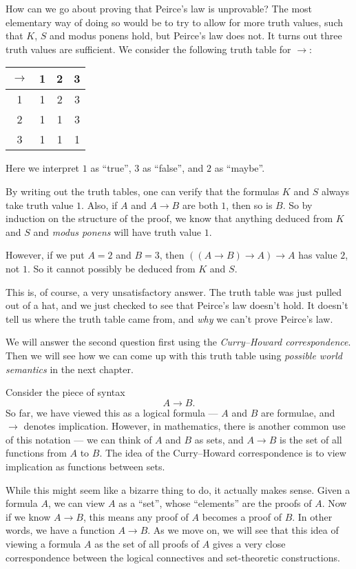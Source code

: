 \documentclass[a4paper]{article}
\begin{document}
How can we go about proving that Peirce's law is unprovable? The most elementary way of doing so would be to try to allow for more truth values, such that $K$, $S$ and modus ponens hold, but Peirce's law does not. It turns out three truth values are sufficient. We consider the following truth table for $\to$:
\begin{center}
  \begin{tabular}{cccc}
    \toprule
    $\to$ & 1 & 2 & 3\\
    \midrule
    1 & 1 & 2 & 3\\
    2 & 1 & 1 & 3\\
    3 & 1 & 1 & 1\\
    \bottomrule
  \end{tabular}
\end{center}
Here we interpret $1$ as ``true'', $3$ as ``false'', and $2$ as ``maybe''.

By writing out the truth tables, one can verify that the formulas $K$ and $S$ always take truth value $1$. Also, if $A$ and $A \to B$ are both $1$, then so is $B$. So by induction on the structure of the proof, we know that anything deduced from $K$ and $S$ and \emph{modus ponens} will have truth value $1$.

However, if we put $A = 2$ and $B = 3$, then $((A \to B) \to A) \to A$ has value $2$, not $1$. So it cannot possibly be deduced from $K$ and $S$.

This is, of course, a very unsatisfactory answer. The truth table was just pulled out of a hat, and we just checked to see that Peirce's law doesn't hold. It doesn't tell us where the truth table came from, and \emph{why} we can't prove Peirce's law.

We will answer the second question first using the \emph{Curry--Howard correspondence}. Then we will see how we can come up with this truth table using \emph{possible world semantics} in the next chapter.

Consider the piece of syntax
\[
  A \to B.
\]
So far, we have viewed this as a logical formula --- $A$ and $B$ are formulae, and $\to$ denotes implication. However, in mathematics, there is another common use of this notation --- we can think of $A$ and $B$ as sets, and $A \to B$ is the set of all functions from $A$ to $B$. The idea of the Curry--Howard correspondence is to view implication as functions between sets.

While this might seem like a bizarre thing to do, it actually makes sense. Given a formula $A$, we can view $A$ as a ``set'', whose ``elements'' are the proofs of $A$. Now if we know $A \to B$, this means any proof of $A$ becomes a proof of $B$. In other words, we have a function $A \to B$. As we move on, we will see that this idea of viewing a formula $A$ as the set of all proofs of $A$ gives a very close correspondence between the logical connectives and set-theoretic constructions.
\end{document}
